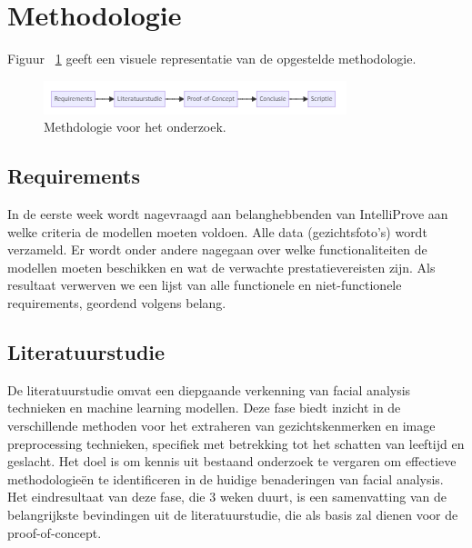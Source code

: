 \section{Methodologie}%
\label{sec:methodologie}
Figuur {~\ref{fig:methodologie}} geeft een visuele representatie van de opgestelde methodologie.
\begin{figure}
    \centering
    \includegraphics[width=\columnwidth]{graphics/flowchart.PNG}
    \caption{\label{fig:methodologie}Methdologie voor het onderzoek.}
\end{figure}

\subsection{Requirements}
\label{sub:requirements}
In de eerste week wordt nagevraagd aan belanghebbenden van IntelliProve aan welke criteria de modellen moeten voldoen. Alle data (gezichtsfoto's) wordt verzameld. Er wordt onder andere nagegaan over welke functionaliteiten de modellen moeten beschikken en wat de verwachte prestatievereisten zijn. 
Als resultaat verwerven we een lijst van alle functionele en niet-functionele requirements, geordend volgens belang. 

\subsection{Literatuurstudie}
\label{sub:literatuurstudie}
De literatuurstudie omvat een diepgaande verkenning van facial analysis technieken en machine learning modellen. 
Deze fase biedt inzicht in de verschillende methoden voor het extraheren van gezichtskenmerken en image preprocessing technieken, specifiek met betrekking tot het schatten van leeftijd en geslacht.
Het doel is om kennis uit bestaand onderzoek te vergaren om effectieve methodologieën te identificeren in de huidige benaderingen van facial analysis. 
Het eindresultaat van deze fase, die 3 weken duurt, is een samenvatting van de belangrijkste bevindingen uit de literatuurstudie, die als basis zal dienen voor de proof-of-concept.
